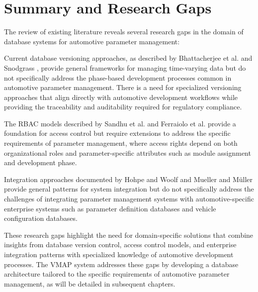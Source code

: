 \section{Summary and Research Gaps}
\label{sec:summary-gaps}

The review of existing literature reveals several research gaps in the domain of database systems for automotive parameter management:

Current database versioning approaches, as described by Bhattacherjee et al. \cite{bhattacherjee2015principles} and Snodgrass \cite{snodgrass1999developing}, provide general frameworks for managing time-varying data but do not specifically address the phase-based development processes common in automotive parameter management. There is a need for specialized versioning approaches that align directly with automotive development workflows while providing the traceability and auditability required for regulatory compliance.

The \ac{RBAC} models described by Sandhu et al. \cite{sandhu1998role} and Ferraiolo et al. \cite{ferraiolo2011policy} provide a foundation for access control but require extensions to address the specific requirements of parameter management, where access rights depend on both organizational roles and parameter-specific attributes such as module assignment and development phase.

Integration approaches documented by Hohpe and Woolf \cite{hohpe2002enterprise} and Mueller and Müller \cite{mueller2018conception} provide general patterns for system integration but do not specifically address the challenges of integrating parameter management systems with automotive-specific enterprise systems such as parameter definition databases and vehicle configuration databases.

These research gaps highlight the need for domain-specific solutions that combine insights from database version control, access control models, and enterprise integration patterns with specialized knowledge of automotive development processes. The \ac{VMAP} system addresses these gaps by developing a database architecture tailored to the specific requirements of automotive parameter management, as will be detailed in subsequent chapters.